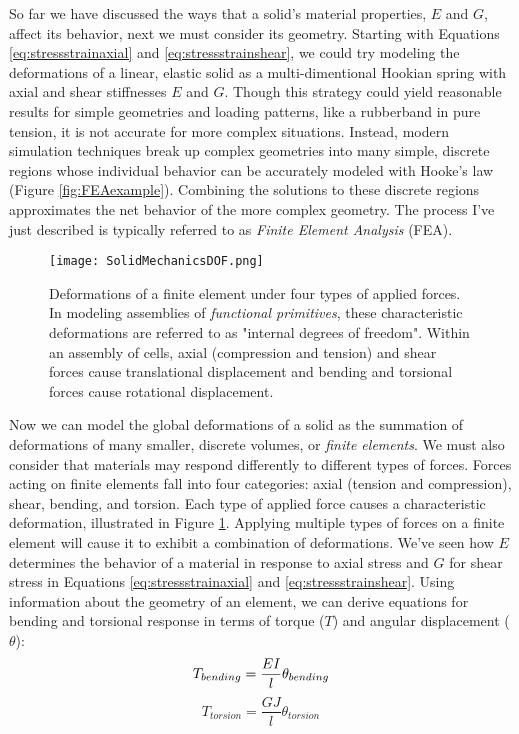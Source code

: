 {So far we have discussed the ways that a solid's material properties, $E$ and $G$, affect its behavior, next we must consider its geometry.  Starting with Equations \ref{eq:stressstrainaxial} and  \ref{eq:stressstrainshear}, we could try modeling the deformations of a linear, elastic solid as a multi-dimentional Hookian spring with axial and shear stiffnesses $E$ and $G$.  Though this strategy could yield reasonable results for simple geometries and loading patterns, like a rubberband in pure tension, it is not accurate for more complex situations.  Instead, modern simulation techniques break up complex geometries into many simple, discrete regions whose individual behavior can be accurately modeled with Hooke's law (Figure \ref{fig:FEAexample}).  Combining the solutions to these discrete regions approximates the net behavior of the more complex geometry.  The process I've just described is typically referred to as \textit{Finite Element Analysis} (FEA).\\

\begin{figure}
  \texttt{[image: SolidMechanicsDOF.png]}
  \caption{Deformations of a finite element under four types of applied forces.  In modeling assemblies of \textit{functional primitives}, these characteristic deformations are referred to as "internal degrees of freedom".  Within an assembly of cells, axial (compression and tension) and shear forces cause translational displacement and bending and torsional forces cause rotational displacement.}
  \label{fig:SolidMechanicsDOF}
\end{figure}

Now we can model the global deformations of a solid as the summation of deformations of many smaller, discrete volumes, or \textit{finite elements}.  We must also consider that materials may respond differently to different types of forces.  Forces acting on finite elements fall into four categories: axial (tension and compression), shear, bending, and torsion.  Each type of applied force causes a characteristic deformation, illustrated in Figure \ref{fig:SolidMechanicsDOF}.  Applying multiple types of forces on a finite element will cause it to exhibit a combination of deformations.  We've seen how $E$ determines the behavior of a material in response to axial stress and $G$ for shear stress in Equations \ref{eq:stressstrainaxial} and  \ref{eq:stressstrainshear}.  Using information about the geometry of an element, we can derive equations for bending and torsional response in terms of torque ($T$) and angular displacement ($\theta$):
\begin{equation}\label{eq:stressstrainbending}
T_{bending} = \dfrac{EI}{l}\theta_{bending}\\[10pt]
\end{equation}
\begin{equation}\label{eq:stressstraintorsion}
T_{torsion} = \dfrac{GJ}{l}\theta_{torsion} 
\end{equation}

}
